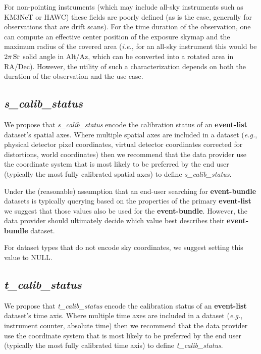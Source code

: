 \documentclass[11pt,a4paper]{ivoa}
\begin{document}
For non-pointing instruments (which may include all-sky instruments such as KM3NeT or HAWC) these fields are poorly defined (as is the case, generally for observations that are drift scans).  For the time duration of the observation, one can compute an effective center position of the exposure skymap and the maximum radius of the covered area ({\em i.e.\/}, for an all-sky instrument this would be $2\pi\,\rm Sr$ solid angle in Alt/Az, which can be converted into a rotated area in RA/Dec).  However, the utility of such a characterization depends on both the duration of the observation and the use case.

\subsection{{\em s\_calib\_status}}

We propose that {\em s\_calib\_status} encode the calibration status of an {\bf event-list} dataset's spatial axes.  Where multiple spatial axes are included in a dataset ({\em e.g.\/}, physical detector pixel coordinates, virtual detector coordinates corrected for distortions, world coordinates) then we recommend that the data provider use the coordinate system that is most likely to be preferred by the end user (typically the most fully calibrated spatial axes) to define {\em s\_calib\_status\/}.

Under the (reasonable) assumption that an end-user searching for {\bf event-bundle} datasets is typically querying based on the properties of the primary {\bf event-list} we suggest that those values also be used for the {\bf event-bundle}.  However, the data provider should ultimately decide which value best describes their {\bf event-bundle} dataset.

For dataset types that do not encode sky coordinates, we suggest setting this value to NULL\null.

\subsection{{\em t\_calib\_status}}

We propose that {\em t\_calib\_status}  encode the calibration status of an {\bf event-list} dataset's time axis.  Where multiple time axes are included in a dataset ({\em e.g.\/}, instrument counter, absolute time) then we recommend that the data provider use the coordinate system that is most likely to be preferred by the end user (typically the most fully calibrated time axis) to define {\em t\_calib\_status\/}.
\end{document}
